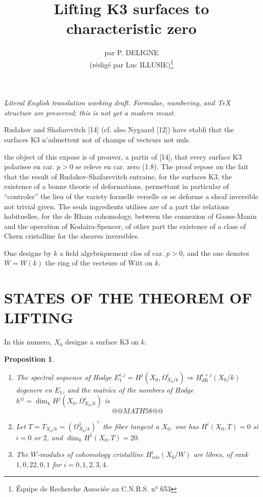\documentclass[12pt,a4paper]{article}
\title{Lifting K3 surfaces to characteristic zero}
\author{par P. DELIGNE\\(rédigé par Luc ILLUSIE)\thanks{Équipe de Recherche Associée au C.N.R.S. n° 653}}
\date{}
\theoremstyle{plain}
\newtheorem{proposition}[theorem]{Proposition}
\theoremstyle{definition}
\theoremstyle{remark}
\newcommand{\cris}{\mathrm{cris}}
\begin{document}
\begin{center}\small\emph{Literal English translation working draft. Formulae, numbering, and TeX structure are preserved; this is not yet a modern recast.}\end{center}
\vspace{0.5em}

\maketitle
\thispagestyle{empty}

Rudakov and Shafarevitch [14] (cf. also Nygaard [12]) have etabli that the surfaces K3 n'admettent not of champs of vecteurs not nuls.

the object of this expose is of prouver, a partir of [14], that every surface K3 polarisee en car. $p > 0$ se releve en car. zero (1.8). The proof repose on the fait that the result of Rudakov-Shafarevitch entraine, for the surfaces K3, the existence of a bonne theorie of deformations, permettant in particular of ``controler'' the lieu of the variety formelle verselle or se deforme a sheaf inversible not trivial given. The seuls ingredients utilises are of a part the relations habituelles, for the de Rham cohomology, between the connexion of Gauss-Manin and the operation of Kodaira-Spencer, of other part the existence of a class of Chern cristalline for the sheaves inversibles.

One designe by $k$ a field algebriquement clos of car. $p > 0$, and the one denotes $W = W(k)$ the ring of the vecteurs of Witt on $k$.

\section{STATES OF THE THEOREM OF LIFTING}

In this numero, $X_0$ designe a surface K3 on $k$.

\begin{proposition}\label{prop:1.1}

\begin{enumerate}[label=\alph*)]
\item The spectral sequence of Hodge $E_1^{i,j} = H^j(X_0, \Omega_{X_0/k}^i) \Rightarrow H^{i+j}_{\mathrm{dR}}(X_0/k)$ degenere en $E_1$, and the matrice of the nombres of Hodge $h^{ij} = \dim_k H^j(X_0, \Omega_{X_0/k}^i)$ is
\[
@@MATH58@@
\]

\item Let $T = T_{X_0/k} = (\Omega_{X_0/k}^1)^{\vee}$ the fiber tangent a $X_0$. one has $H^i(X_0, T) = 0$ si $i = 0$ or $2$, and $\dim_k H^1(X_0, T) = 20$.

\item The $W$-modules of cohomology cristalline $H^i_{\cris}(X_0/W)$ are libres, of rank $1, 0, 22, 0, 1$ for $i = 0, 1, 2, 3, 4$.
\end{enumerate}
\end{proposition}
\end{document}
